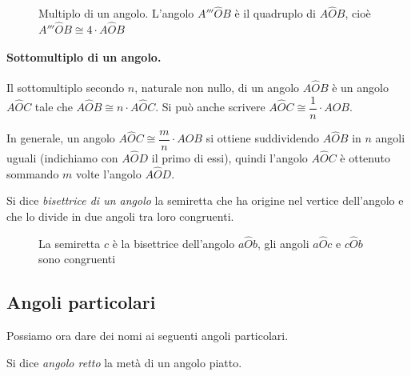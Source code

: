 \begin{inaccessibleblock}
 \begin{figure}[htb]
\centering
\caption{Multiplo di un angolo. L'angolo $A'''\widehat{O}B$ è il 
quadruplo di $A\widehat{O}B$, cioè $A'''\widehat{O}B \cong 4\cdot 
A\widehat{O}B$}
\end{figure}
\end{inaccessibleblock}

\paragraph{Sottomultiplo di un angolo.} Il sottomultiplo secondo $n$, 
naturale non nullo, di un angolo $A\widehat{O}B$ è un angolo 
$A\widehat{O}C$ tale che $A\widehat{O}B \cong n\cdot A\widehat{O}C$. 
Si può anche scrivere $A\widehat{O}C\cong \dfrac{1}{n}\cdot 
A\widehat{O}B$.

In generale, un angolo $A\widehat{O}C\cong\dfrac{m}{n}\cdot 
A\widehat{O}B$ si ottiene suddividendo $A\widehat{O}B$ in $n$ angoli 
uguali (indichiamo con $A\widehat{O}D$ il primo di essi), quindi 
l'angolo $A\widehat{O}C$ è ottenuto sommando $m$ volte l'angolo 
$A\widehat{O}D$.

\begin{definizione}
Si dice \emph{bisettrice di un angolo} la semiretta che ha origine 
nel vertice dell'angolo e che lo divide in due angoli tra loro 
congruenti.
\end{definizione}


\begin{inaccessibleblock}
 \begin{figure}[htb]
\centering
\caption{La semiretta $c$ è la bisettrice dell'angolo 
$a\widehat{O}b$, gli angoli $a\widehat{O}c$ e $c\widehat{O}b$ sono 
congruenti}
\end{figure}
\end{inaccessibleblock}

\subsection{Angoli particolari}

Possiamo ora dare dei nomi ai seguenti angoli particolari.

\begin{definizione}
Si dice \emph{angolo retto} la metà di un angolo piatto.
\end{definizione}

